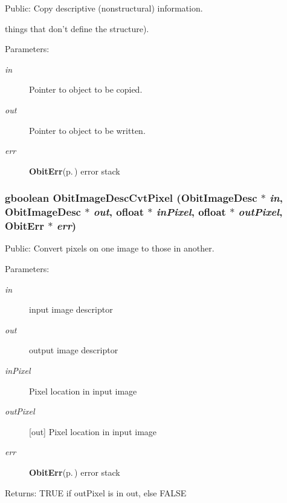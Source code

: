 Public: Copy descriptive (nonstructural) information. 

things that don't define the structure). \begin{Desc}
\item[Parameters:]
\begin{description}
\item[{\em in}]Pointer to object to be copied. \item[{\em out}]Pointer to object to be written. \item[{\em err}]{\bf Obit\-Err}{\rm (p.\,\pageref{structObitErr})} error stack \end{description}
\end{Desc}
\subsubsection{\setlength{\rightskip}{0pt plus 5cm}gboolean Obit\-Image\-Desc\-Cvt\-Pixel ({\bf Obit\-Image\-Desc} $\ast$ {\em in}, {\bf Obit\-Image\-Desc} $\ast$ {\em out}, {\bf ofloat} $\ast$ {\em in\-Pixel}, {\bf ofloat} $\ast$ {\em out\-Pixel}, {\bf Obit\-Err} $\ast$ {\em err})}\label{ObitImageDesc_8h_a16}


Public: Convert pixels on one image to those in another. 

\begin{Desc}
\item[Parameters:]
\begin{description}
\item[{\em in}]input image descriptor \item[{\em out}]output image descriptor \item[{\em in\-Pixel}]Pixel location in input image \item[{\em out\-Pixel}][out] Pixel location in input image \item[{\em err}]{\bf Obit\-Err}{\rm (p.\,\pageref{structObitErr})} error stack \end{description}
\end{Desc}
\begin{Desc}
\item[Returns:]TRUE if out\-Pixel is in out, else FALSE \end{Desc}

